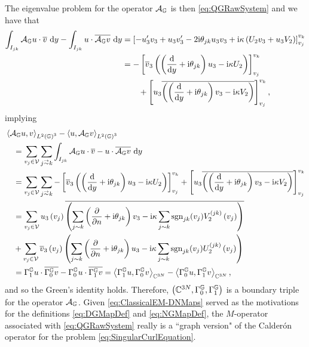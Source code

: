 The eigenvalue problem for the operator $\mathcal{A}_{\mathbb{G}}$ is then \eqref{eq:QGRawSystem} and we have that
\begin{align*}
	\int_{I_{jk}} \mathcal{A}_{\mathbb{G}} u \cdot \overline{v}  \ \mathrm{d}y - \int_{I_{jk}} u \cdot \overline{\mathcal{A}_{\mathbb{G}} v}  \ \mathrm{d}y
	&= \left[  -u'_3 v_3 + u_3 v_3' - 2\mathrm{i}\theta_{jk}u_3 v_3 + \mathrm{i}\kappa\left( U_2 v_3 + u_3 V_2 \right)  \right]_{v_j}^{v_k} \\
	&= -\left[  \overline{v}_3\left(  \left( \dfrac{\mathrm{d}}{\mathrm{d}y} + \mathrm{i}\theta_{jk}  \right)u_3 - \mathrm{i}\kappa U_2  \right)  \right]_{v_j}^{v_k} \\
	&\qquad + \left[  u_3\overline{\left(  \left( \dfrac{\mathrm{d}}{\mathrm{d}y} + \mathrm{i}\theta_{jk}  \right)v_3 - \mathrm{i}\kappa V_2  \right)}  \right]_{v_j}^{v_k},
\end{align*}
implying
\begin{align*}
	&\ip{\ag u}{v}_{L^2\bracs{\graph}^3} - \ip{u}{\ag v}_{L^2\bracs{\graph}^3} \\
	&\quad = \sum_{v_j\in\vertSet}\sum_{j\conLeft k} \integral{I_{jk}}{ \ag u \cdot \overline{v} - u \cdot \overline{\ag v} }{y} \\
	&\quad = \sum_{v_j\in\vertSet}\sum_{j\conLeft k} -\sqbracs{ \overline{v}_3\bracs{ \bracs{\diff{}{y} + \rmi\qm_{jk} }u_3 - \rmi\wavenumber U_2 } }_{v_j}^{v_k}
	+ \sqbracs{ u_3\overline{\bracs{ \bracs{\diff{}{y} + \rmi\qm_{jk} }v_3 - \rmi\wavenumber V_2 }} }_{v_j}^{v_k} \\
	&\quad = \sum_{v_j\in\vertSet} u_3\bracs{v_j}\overline{\bracs{ \sum_{j\con k}\bracs{\pdiff{}{n} + \rmi\qm_{jk}}v_3 - \rmi\wavenumber\sum_{j\con k} \sgn_{jk}(v_j) V_2^{(jk)}\bracs{v_j} }} \\
	&\quad + \sum_{v_j\in\vertSet} \overline{v}_3\bracs{v_j}\bracs{ \sum_{j\con k}\bracs{\pdiff{}{n} + \rmi\qm_{jk}}u_3 - \rmi\wavenumber\sum_{j\con k} \sgn_{jk}(v_j) U_2^{(jk)}\bracs{v_j} } \\
	&\quad = \ngmap u \cdot \overline{\dgmap v} - \dgmap u \cdot \overline{\ngmap v}
	= \ip{\ngmap u}{\dgmap v}_{\complex^{3N}} - \ip{\dgmap u}{\ngmap v}_{\complex^{3N}},
\end{align*}
and so the Green's identity holds. 
Therefore, $\left( \mathbb{C}^{3N}, \Gamma_0^{\mathbb{G}}, \Gamma_1^{\mathbb{G}} \right)$ is a boundary triple for the operator $\mathcal{A}_{\mathbb{G}}$.
Given \eqref{eq:ClassicalEM-DNMaps} served as the motivations for the definitions \eqref{eq:DGMapDef} and \eqref{eq:NGMapDef}, the $M$-operator associated with \eqref{eq:QGRawSystem} really is a ``graph version" of the Calder\'on operator for the problem \eqref{eq:SingularCurlEquation}.

